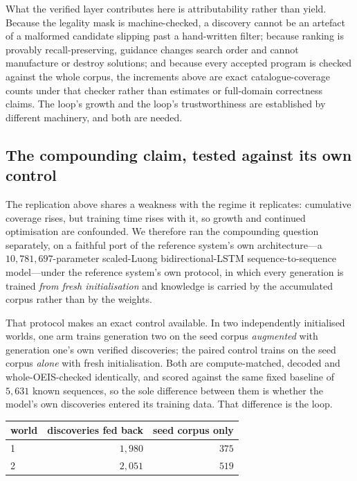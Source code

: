 \documentclass[11pt]{article}
\begin{document}
What the verified layer contributes here is attributability rather than yield. Because the
legality mask is machine-checked, a discovery cannot be an artefact of a malformed
candidate slipping past a hand-written filter; because ranking is provably
recall-preserving, guidance changes search order and cannot manufacture or destroy
solutions; and because every accepted program is checked against the whole corpus, the
increments above are exact catalogue-coverage counts under that checker rather than
estimates or full-domain correctness claims. The loop's growth and the loop's
trustworthiness are established by different machinery, and both are needed.

\subsection{The compounding claim, tested against its own control}
\label{sec:loopcontrol}

The replication above shares a weakness with the regime it replicates: cumulative coverage
rises, but training time rises with it, so growth and continued optimisation are
confounded. We therefore ran the compounding question separately, on a faithful port of
the reference system's own architecture---a $10{,}781{,}697$-parameter scaled-Luong
bidirectional-LSTM sequence-to-sequence model---under the reference system's own protocol,
in which every generation is trained \emph{from fresh initialisation} and knowledge is
carried by the accumulated corpus rather than by the weights.

That protocol makes an exact control available. In two independently initialised worlds,
one arm trains generation two on the seed corpus \emph{augmented} with generation one's own
verified discoveries; the paired control trains on the seed corpus \emph{alone} with fresh
initialisation. Both are compute-matched, decoded and whole-OEIS-checked identically, and
scored against the same fixed baseline of $5{,}631$ known sequences, so the sole difference
between them is whether the model's own discoveries entered its training data. That
difference is the loop.

\begin{center}
\begin{tabular}{lrr}
\toprule
world & discoveries fed back & seed corpus only \\
\midrule
1 & $1{,}980$ & $375$ \\
2 & $2{,}051$ & $519$ \\
\bottomrule
\end{tabular}
\end{center}
\end{document}
